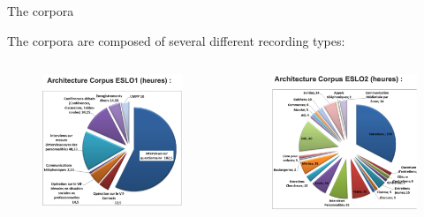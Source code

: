 \documentclass[lesson_slides]{subfiles}
\begin{document}
\begin{frame}[c]{The corpora}

    \noindent The corpora are composed of several different recording types:

\begin{columns}
        \begin{figure}
        \centering
        \includegraphics[width=\textwidth]{images/eslo1.png}
        \end{figure}
        \begin{figure}
        \centering
        \includegraphics[width=\textwidth]{images/eslo2.png}
        \end{figure}
    \end{columns}
    

\end{frame}
\end{document}
